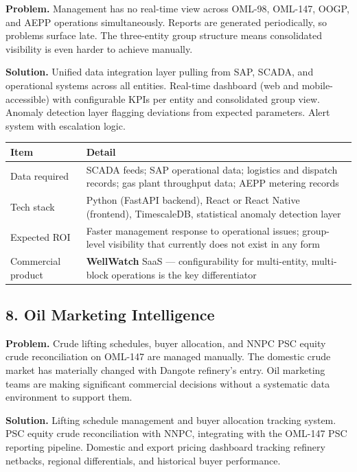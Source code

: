 \documentclass[10pt]{article}
\newcommand{\spacer}{\vspace{10pt}}
\newcommand{\bigspacer}{\vspace{16pt}}
\begin{document}
\textbf{Problem.}
Management has no real-time view across OML-98, OML-147, OOGP, and AEPP
operations simultaneously. Reports are generated periodically, so problems
surface late. The three-entity group structure means consolidated visibility
is even harder to achieve manually.

\textbf{Solution.}
Unified data integration layer pulling from SAP, SCADA, and operational
systems across all entities. Real-time dashboard (web and mobile-accessible)
with configurable KPIs per entity and consolidated group view. Anomaly
detection layer flagging deviations from expected parameters. Alert system
with escalation logic.

\spacer
\small
\begin{tabularx}{\columnwidth}{@{}lX@{}}
\toprule
\textbf{Item} & \textbf{Detail} \\
\midrule
Data required     & SCADA feeds; SAP operational data; logistics and
                    dispatch records; gas plant throughput data; AEPP
                    metering records \\
Tech stack        & Python (FastAPI backend), React or React Native (frontend),
                    TimescaleDB, statistical anomaly detection layer \\
Expected ROI      & Faster management response to operational issues;
                    group-level visibility that currently does not exist
                    in any form \\
Commercial product & \textbf{WellWatch} SaaS --- configurability for
                    multi-entity, multi-block operations is the key
                    differentiator \\
\bottomrule
\end{tabularx}
\normalsize

\bigspacer

\subsection*{8. Oil Marketing Intelligence}

\textbf{Problem.}
Crude lifting schedules, buyer allocation, and NNPC PSC equity crude
reconciliation on OML-147 are managed manually. The domestic crude market
has materially changed with Dangote refinery's entry. Oil marketing teams
are making significant commercial decisions without a systematic data
environment to support them.

\textbf{Solution.}
Lifting schedule management and buyer allocation tracking system. PSC equity
crude reconciliation with NNPC, integrating with the OML-147 PSC reporting
pipeline. Domestic and export pricing dashboard tracking refinery netbacks,
regional differentials, and historical buyer performance.
\end{document}

